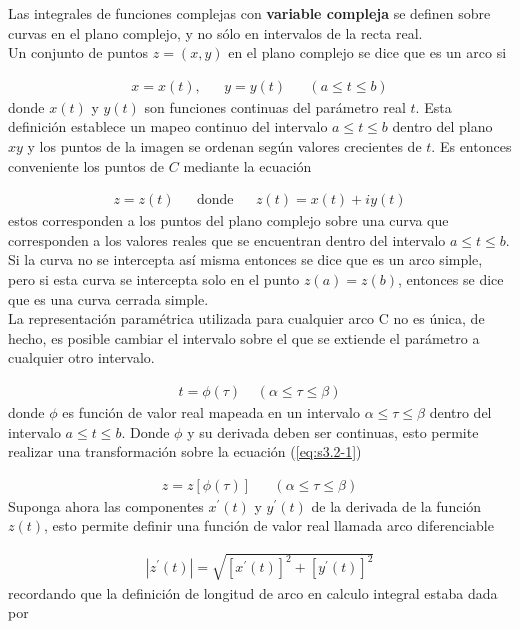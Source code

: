 Las integrales de funciones complejas con \textbf{variable compleja} se definen sobre curvas en el plano complejo, y no sólo en intervalos de la recta real.\newline \\
Un conjunto de puntos $z = (x, y)$ en el plano complejo se dice que es un arco si

\begin{align*}
    x = x(t), && y = y(t) && (a \leq t \leq b)
\end{align*}
donde $x(t)$ y $y(t)$ son funciones continuas del parámetro real $t$. Esta definición establece un mapeo continuo del intervalo $a \leq t \leq b$ dentro del plano $xy$ y los puntos de la imagen se ordenan según valores crecientes de $t$. Es entonces conveniente los puntos de $C$ mediante la ecuación 

\begin{align}
    \label{eq:s3.2-1}z = z(t) && \text{donde}&& z(t) = x(t) + iy(t) 
\end{align}
estos corresponden a los puntos del plano complejo sobre una curva que corresponden a los valores reales que se encuentran dentro del intervalo $a \leq t \leq b$. Si la curva no se intercepta así misma entonces se dice que es un arco simple, pero si esta curva se intercepta solo en el punto $z(a) = z(b)$, entonces se dice que es una curva cerrada simple.\newline \\
La representación paramétrica utilizada para cualquier arco C no es única, de hecho, es posible cambiar el intervalo sobre el que se extiende el parámetro a cualquier otro intervalo.

\begin{gather}
    t = \phi(\tau) \;\;\;\; (\alpha \leq \tau \leq \beta)
\end{gather}
donde $\phi$ es función de valor real mapeada en un intervalo  $\alpha \leq \tau \leq \beta$ dentro del intervalo $a \leq t \leq b$. Donde $\phi$ y su derivada deben ser continuas, esto permite realizar una transformación sobre la ecuación (\ref*{eq:s3.2-1})

\begin{align}
    z = z[\phi(\tau)] && (\alpha \leq \tau \leq \beta)
\end{align}
Suponga ahora las componentes $x^{\prime}(t)$ y $y^{\prime}(t)$ de la derivada de la función $z(t)$, esto permite definir una función de valor real llamada arco diferenciable

\begin{gather*}
    |z^{\prime}(t)| = \sqrt{[x^{\prime}(t)]^2 + [y^{\prime}(t)]^2}
\end{gather*}
recordando que la definición de longitud de arco en calculo integral estaba dada por

